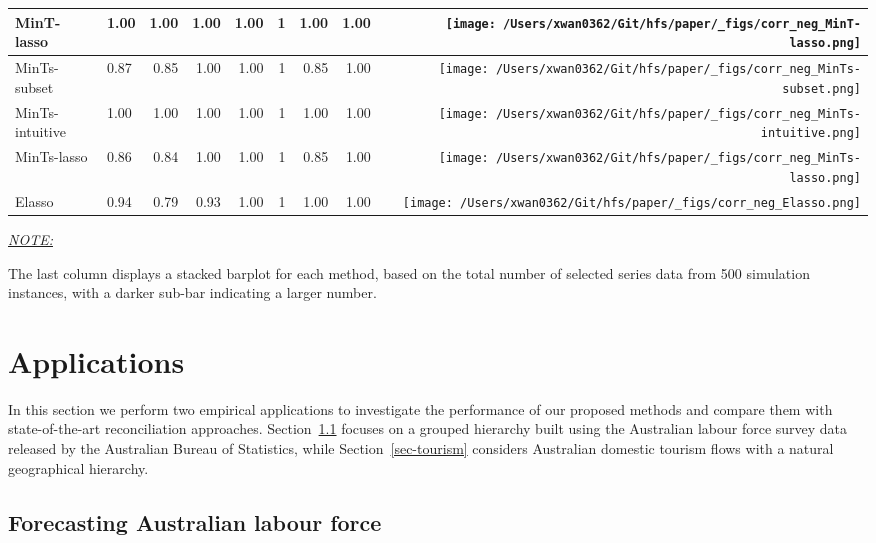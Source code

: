 \documentclass[11pt,a4paper,]{article}
\begin{document}
\begin{table}[!h]
{\begin{threeparttable}
\begin{tabular}{llrrrrrr>{}r}
MinT-lasso & 1.00 & 1.00 & 1.00 & 1.00 & 1 & 1.00 & 1.00 & \texttt{[image: /Users/xwan0362/Git/hfs/paper/\_figs/corr\_neg\_MinT-lasso.png]}\\
\midrule
MinTs-subset & 0.87 & 0.85 & 1.00 & 1.00 & 1 & 0.85 & 1.00 & \texttt{[image: /Users/xwan0362/Git/hfs/paper/\_figs/corr\_neg\_MinTs-subset.png]}\\
MinTs-intuitive & 1.00 & 1.00 & 1.00 & 1.00 & 1 & 1.00 & 1.00 & \texttt{[image: /Users/xwan0362/Git/hfs/paper/\_figs/corr\_neg\_MinTs-intuitive.png]}\\
MinTs-lasso & 0.86 & 0.84 & 1.00 & 1.00 & 1 & 0.85 & 1.00 & \texttt{[image: /Users/xwan0362/Git/hfs/paper/\_figs/corr\_neg\_MinTs-lasso.png]}\\
\midrule
Elasso & 0.94 & 0.79 & 0.93 & 1.00 & 1 & 1.00 & 1.00 & \texttt{[image: /Users/xwan0362/Git/hfs/paper/\_figs/corr\_neg\_Elasso.png]}\\
\bottomrule
\end{tabular}
\begin{tablenotes}[para]
\item \underline{\textit{NOTE:}} 
\item The last column displays a stacked barplot for each method, based on the total number of selected series data from 500 simulation instances, with a darker sub-bar indicating a larger number.
\end{tablenotes}
\end{threeparttable}}
\endgroup{}
\end{table}

\hypertarget{sec-applications}{%
\section{Applications}\label{sec-applications}}

In this section we perform two empirical applications to investigate the
performance of our proposed methods and compare them with
state-of-the-art reconciliation approaches. Section~\ref{sec-labour}
focuses on a grouped hierarchy built using the Australian labour force
survey data released by the Australian Bureau of Statistics, while
Section~\ref{sec-tourism} considers Australian domestic tourism flows
with a natural geographical hierarchy.

\hypertarget{sec-labour}{%
\subsection{Forecasting Australian labour force}\label{sec-labour}}
\end{document}
